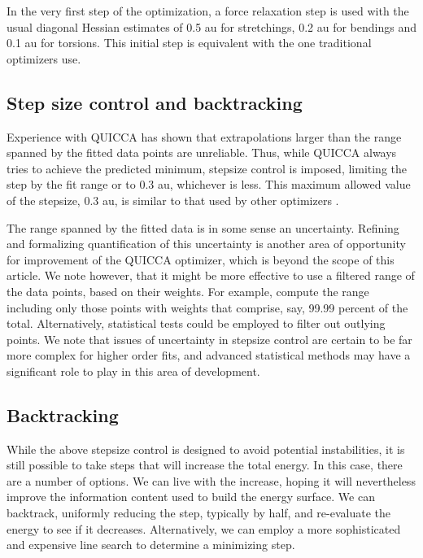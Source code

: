 \documentclass[prl,twocolumn,showpacs,twocolumngrid,superbib]{revtex4}
\begin{document}
In the very first step of the optimization, a force relaxation step is used with the usual 
diagonal Hessian estimates of 0.5 au for stretchings, 0.2 au for bendings and 0.1 au for 
torsions.  This initial step is equivalent with the one traditional optimizers use.

\subsection{Step size control and backtracking}

Experience with QUICCA has shown that extrapolations larger 
than the range spanned by the fitted data points are unreliable.   Thus, 
while QUICCA  always tries to achieve the predicted minimum, 
stepsize control is imposed, limiting the step  by  the fit range or to 
0.3 au, whichever is less.   This maximum allowed value of the stepsize, 0.3 au, 
is similar to that used by other optimizers \cite{eckert}.  

The range spanned by the fitted data is in some sense an uncertainty.  
Refining and formalizing quantification of this uncertainty is another area of 
opportunity for improvement of the QUICCA optimizer, which is beyond the 
scope of this article.  We note however, that it might be more effective
to use a filtered range of the data points, based on their weights. 
For example, compute the range including only those points with weights that 
comprise, say,  99.99 percent of the total.   Alternatively, statistical 
tests could be employed to filter out outlying points.  We note that issues of
uncertainty in stepsize control are certain to be far more complex for higher 
order fits, and advanced statistical methods may have a significant role 
to play in this area of development.

\subsection{Backtracking}

While the above stepsize control is designed to avoid potential instabilities,
it is still possible to take steps that will increase the total energy.  In 
this case, there are a number of options.  We can live with the increase, 
hoping it will nevertheless improve the information content used to build the energy 
surface.  We can backtrack, uniformly reducing the step, typically by half, and re-evaluate
the energy to see if it decreases.   Alternatively, we can employ a more 
sophisticated and expensive line search to determine a minimizing step.  
\end{document}
